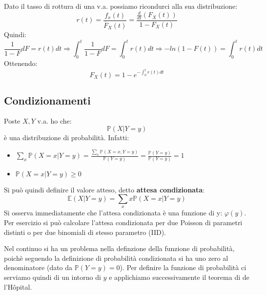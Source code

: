 Dato il tasso di rottura di una v.a. possiamo ricondurci alla sua distribuzione:
\[r(t)=\frac{f_x(t)}{\overline{F}_X(t)}=\frac{\frac{d}{dt}\left(F_X(t)\right)}{1-F_X(t)}\]
Quindi:
\[\frac{1}{1-F}dF=r(t)dt \Rightarrow \int_0^t\frac{1}{1-F}dF=\int_0^t r(t)dt \Rightarrow -ln(1-F(t))=\int_0^t r(t)dt\]
Ottenendo:
\[F_X(t)=1-e^{-\int_0^t r(t)dt}\]
\subsection{Condizionamenti}

Poste $X,Y$ v.a. ho che:
\begin{equation}
    \mathbb{P}(X|Y=y)
\end{equation}
è una distribuzione di probabilità. Infatti:
\begin{itemize}
    \item $\sum_x \mathbb{P}(X=x|Y=y)= \frac{\sum_x \mathbb{P}(X=x,Y=y)}{\mathbb{P}(Y=y)}=\frac{\mathbb{P}(Y=y)}{\mathbb{P}(Y=y)}=1$
    \item $\mathbb{P}(X=x|Y=y)\geq0$
\end{itemize}
Si può quindi definire il valore atteso, detto \textbf{attesa condizionata}:
\begin{equation}
    \mathbb{E}(X|Y=y)=\sum_{x}x\mathbb{P}(X=x|Y=y)
\end{equation}
Si osserva immediatamente che l'attesa condizionata è una funzione di y: $\varphi(y)$.
Per esercizio si può calcolare l'attesa condizionata per due Poisson di parametri distinti o per due binomiali di stesso parametro (IID).

Nel continuo si ha un problema nella definzione della funzione di probabilità, poichè seguendo la definizione di probabilità condizionata si ha uno zero al denominatore (dato da $\mathbb{P}(Y=y)=0$). Per definire la funzione di probabilità ci serviamo quindi di un intorno di $y$ e applichiamo successivamente il teorema di de l'Hôpital.

